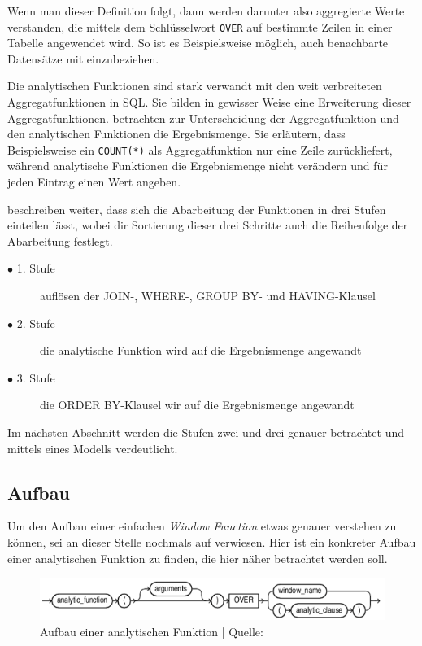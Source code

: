 Wenn man dieser Definition folgt, dann werden darunter also aggregierte Werte
verstanden, die mittels dem Schlüsselwort \texttt{OVER} auf bestimmte Zeilen in
einer Tabelle angewendet wird. So ist es Beispielsweise möglich, auch
benachbarte Datensätze mit einzubeziehen.

Die analytischen Funktionen sind stark verwandt mit den weit verbreiteten
Aggregatfunktionen in SQL. Sie bilden in gewisser Weise eine Erweiterung dieser Aggregatfunktionen.
\cite{Nuijten2023} betrachten zur Unterscheidung der Aggregatfunktion und den
analytischen Funktionen die Ergebnismenge. Sie erläutern, dass Beispielsweise
ein \texttt{COUNT(*)} als Aggregatfunktion nur eine Zeile zurückliefert, während
analytische Funktionen die Ergebnismenge nicht verändern und für jeden Eintrag
einen Wert angeben.

\cite{Nuijten2023} beschreiben weiter, dass sich die Abarbeitung der Funktionen in
drei Stufen einteilen lässt, wobei dir Sortierung dieser drei Schritte auch die
Reihenfolge der Abarbeitung festlegt.

\begin{description}
	\item[$\bullet$ 1. Stufe] auflösen der JOIN-, WHERE-, GROUP BY- und HAVING-Klausel

	\item[$\bullet$ 2. Stufe] die analytische Funktion wird auf die Ergebnismenge angewandt

	\item[$\bullet$ 3. Stufe] die ORDER BY-Klausel wir auf die Ergebnismenge angewandt
\end{description}

Im nächsten Abschnitt werden die Stufen zwei und drei genauer betrachtet und mittels
eines Modells verdeutlicht.

\subsection{Aufbau}
Um den Aufbau einer einfachen \textit{Window Function} etwas genauer verstehen
zu können, sei an dieser Stelle nochmals auf \cite{oracle} verwiesen. Hier ist
ein konkreter Aufbau einer analytischen Funktion zu finden, die hier näher betrachtet
werden soll.

\begin{figure}[h]
	\centering
	\includegraphics[scale=0.5]{img/aufbauAnalyticFunction.jpg}
	\caption{ Aufbau einer analytischen Funktion | Quelle: \cite{oracle}}
\end{figure}

